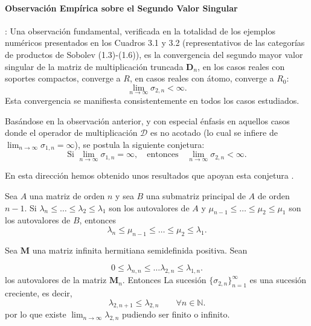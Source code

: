 \paragraph{Observación Empírica sobre el Segundo Valor Singular}: Una observación fundamental, verificada en la totalidad de los ejemplos numéricos presentados en los Cuadros 3.1 y 3.2 (representativos de las categorías de productos de Sobolev (1.3)-(1.6)), es la convergencia del segundo mayor valor singular de la matriz de multiplicación truncada $\mathbf{D}_n$, en los casos reales con soportes compactos, converge a $R$, en casos reales con átomo, converge a $R_0$:
$$
	\lim_{n \to \infty} \sigma_{2,n} < \infty.
$$
Esta convergencia se manifiesta consistentemente en todos los casos estudiados.

\begin{conjetura}
	\label{conj:sigma2_Dn_bounded_if_sigma1_unbounded}
	Basándose en la observación anterior, y con especial énfasis en aquellos casos donde el operador de multiplicación $\mathcal{D}$ es no acotado (lo cual se infiere de $\lim_{n \to \infty} \sigma_{1,n} = \infty$), se postula la siguiente conjetura:
	$$
		\text{Si } \lim_{n \to \infty} \sigma_{1,n} = \infty, \quad \text{entonces} \quad \lim_{n \to \infty} \sigma_{2,n} < \infty.
	$$
\end{conjetura}

\noindent En esta dirección hemos obtenido unos resultados que apoyan esta conjetura \cite{singularValuesOfHessenbergMatrices}.

 \cite{Bhatia1997} Sea  $A$ una matriz de orden  $n$ y sea  $B$ una submatriz principal de  $A$ de  orden  $n-1$. Si $\lambda_n\leq \dots \leq \lambda_2\leq \lambda_1$ son los autovalores de $A$ y  $\mu_{n-1}\leq \dots \leq \mu_2\leq \mu_1$ son los autovalores de $B$, entonces
$$
	\lambda_n \leq \mu_{n-1} \leq \dots \leq \mu_2 \leq \lambda_1.
$$


\begin{proposition} Sea $\mathbf{M}$ una matriz infinita  hermitiana semidefinida positiva. Sean

	$$
		0 \leq \lambda_{n,n}\leq \dots \lambda_{2,n} \leq \lambda_{1,n}.
	$$
	\noindent los autovalores de la matriz $\mathbf{M}_n$. Entonces La sucesión $\{ \sigma_{2,n}\}_{n=1}^{\infty}$ es una sucesión creciente, es decir,
	$$
		\lambda_{2,n+1} \leq \lambda_{2,n} \qquad \forall n\in \mathbb{N}.
	$$
	\noindent por lo que existe $\displaystyle{\lim_{n\to \infty} \lambda_{2,n}}$ pudiendo ser finito o infinito.
\end{proposition}


